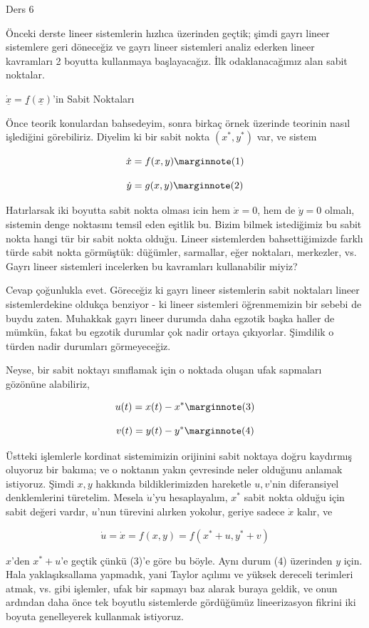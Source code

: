 \documentclass[12pt,fleqn]{article}\usepackage{../../common}
\begin{document}
Ders 6

Önceki derste lineer sistemlerin hızlıca üzerinden geçtik; şimdi gayrı lineer
sistemlere geri döneceğiz ve gayrı lineer sistemleri analiz ederken lineer
kavramları 2 boyutta kullanmaya başlayacağız. İlk odaklanacağımız alan sabit
noktalar.

$\dot{\underline{x}} = \underline{f}(\underline{x})$'in Sabit Noktaları

Önce teorik konulardan bahsedeyim, sonra birkaç örnek üzerinde teorinin nasıl
işlediğini görebiliriz. Diyelim ki bir sabit nokta $(x^\ast,y^\ast)$ var, ve sistem

$$
\dot{x} = f(x,y) 
\mlabel{1}
$$

$$
\dot{y} = g(x,y) 
\mlabel{2}
$$

Hatırlarsak iki boyutta sabit nokta olması icin hem $\dot{x}=0$, hem de
$\dot{y}=0$ olmalı, sistemin denge noktasını temsil eden eşitlik bu. Bizim
bilmek istediğimiz bu sabit nokta hangi tür bir sabit nokta olduğu. Lineer
sistemlerden bahsettiğimizde farklı türde sabit nokta görmüştük: düğümler,
sarmallar, eğer noktaları, merkezler, vs. Gayrı lineer sistemleri incelerken bu
kavramları kullanabilir miyiz?

Cevap çoğunlukla evet. Göreceğiz ki gayrı lineer sistemlerin sabit noktaları
lineer sistemlerdekine oldukça benziyor - ki lineer sistemleri öğrenmemizin bir
sebebi de buydu zaten. Muhakkak gayrı lineer durumda daha egzotik başka haller
de mümkün, fakat bu egzotik durumlar çok nadir ortaya çıkıyorlar. Şimdilik o türden
nadir durumları görmeyeceğiz.

Neyse, bir sabit noktayı sınıflamak için o noktada oluşan ufak sapmaları
gözönüne alabiliriz,

$$ 
u(t) = x(t) - x^\ast 
\mlabel{3}
$$

$$ 
v(t) = y(t) - y^\ast 
\mlabel{4}
$$

Üstteki işlemlerle kordinat sistemimizin orijinini sabit noktaya doğru kaydırmış
oluyoruz bir bakıma; ve o noktanın yakın çevresinde neler olduğunu anlamak
istiyoruz. Şimdi $x,y$ hakkında bildiklerimizden hareketle $u,v$'nin
diferansiyel denklemlerini türetelim. Mesela $\dot{u}$'yu hesaplayalım, $x^\ast$
sabit nokta olduğu için sabit değeri vardır, $u$'nun türevini alırken yokolur,
geriye sadece $\dot{x}$ kalır, ve

$$ \dot{u} = \dot{x} = f(x,y) = f(x^\ast+u, y^\ast+v)$$

$x$'den $x^\ast+u$'e geçtik çünkü (3)'e göre bu böyle. Aynı durum (4) üzerinden $y$
için. Hala yaklaşıksallama yapmadık, yani Taylor açılımı ve yüksek dereceli
terimleri atmak, vs. gibi işlemler, ufak bir sapmayı baz alarak buraya geldik,
ve onun ardından daha önce tek boyutlu sistemlerde gördüğümüz lineerizasyon
fikrini iki boyuta genelleyerek kullanmak istiyoruz.
\end{document}
